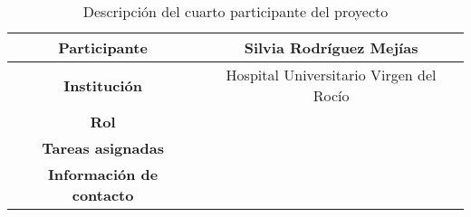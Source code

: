 \begin{table}[H]
    \centering
    \begin{tabular}{|c|c|}
    \hline
    \textbf{Participante} & Silvia Rodríguez Mejías \\
    \hline
    \textbf{Institución} & Hospital Universitario Virgen del Rocío \\
    \hline
    \textbf{Rol} &  \\
    \hline
    \textbf{Tareas asignadas} & \\
    \hline
    \textbf{Información de contacto} & \\
    \hline
    \end{tabular}
\caption{Descripción del cuarto participante del proyecto}
\label{tab:cuartoParticipante}
\end{table}